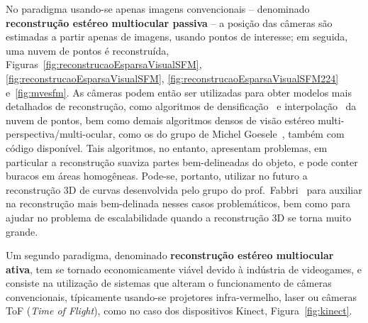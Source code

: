 No paradigma usando-se apenas imagens convencionais -- denominado
\textbf{reconstrução estéreo multiocular passiva} --  a posição das câmeras são
estimadas a partir apenas de imagens, usando pontos de interesse; em seguida, uma
nuvem de pontos é reconstruída,
Figuras~\ref{fig:reconstrucaoEsparsaVisualSFM}, \ref{fig:reconstrucaoEsparsaVisualSFM}, \ref{fig:reconstrucaoEsparsaVisualSFM224}
e~\ref{fig:mvesfm}.
As câmeras podem então ser utilizadas para obter modelos mais detalhados de
reconstrução, como algoritmos de densificação~\cite{furukawa2007dense} e
interpolação~\cite{poisson} da nuvem de pontos, bem como demais algoritmos
densos de visão estéreo multi-perspectiva/multi-ocular, como os do grupo de
Michel Goesele~\cite{mve}, também com código disponível. Tais algoritmos, no
entanto, apresentam problemas, em particular a reconstrução suaviza partes
bem-delineadas do objeto, e pode conter buracos em áreas homogêneas. Pode-se,
portanto, utilizar no futuro a reconstrução 3D de curvas 
desenvolvida pelo grupo do prof.~Fabbri~\cite{Usumezbas:Fabbri:Kimia:ECCV16,Fabbri:Kimia:IJCV2016,Fabbri:Kimia:CVPR10,Fabbri:Giblin:Kimia:ECCV12}
para auxiliar na reconstrução mais bem-delinada nesses casos problemáticos, bem
como para ajudar no problema de escalabilidade quando a reconstrução 3D se torna
muito grande.  

Um segundo paradigma, denominado \textbf{reconstrução estéreo
multiocular ativa}, tem se tornado economicamente viável devido à indústria de videogames, e
consiste na utilização de sistemas que alteram o funcionamento de câmeras
convencionais, típicamente usando-se projetores infra-vermelho, laser ou câmeras
ToF (\emph{Time of Flight}), como no caso dos dispositivos Kinect,
Figura~\ref{fig:kinect}.

